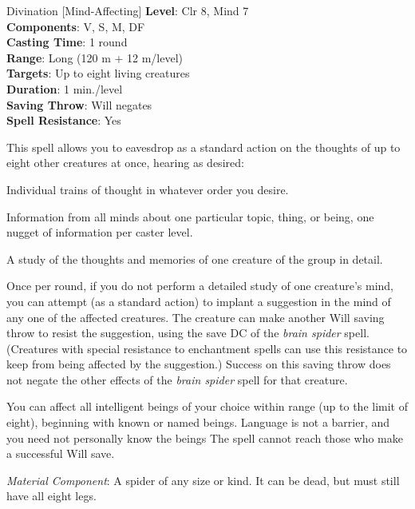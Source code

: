 {Divination [Mind-Affecting]}
{
	\textbf{Level}: Clr 8, Mind 7\\
	\textbf{Components}: V, S, M, DF\\
	\textbf{Casting Time}: 1 round\\
	\textbf{Range}: Long (120 m + 12 m/level)\\
	\textbf{Targets}: Up to eight living creatures\\
	\textbf{Duration}: 1 min./level\\
	\textbf{Saving Throw}: Will negates\\
	\textbf{Spell Resistance}: Yes\\
}
{
	This spell allows you to eavesdrop as a standard action on the thoughts of up to eight other creatures at once, hearing as desired:
	\begin{itemize*}
		\item Individual trains of thought in whatever order you desire.
		\item Information from all minds about one particular topic, thing, or being, one nugget of information per caster level.
		\item A study of the thoughts and memories of one creature of the group in detail.
	\end{itemize*}

	Once per round, if you do not perform a detailed study of one creature's mind, you can attempt (as a standard action) to implant a suggestion in the mind of any one of the affected creatures. The creature can make another Will saving throw to resist the suggestion, using the save DC of the \emph{brain spider} spell. (Creatures with special resistance to enchantment spells can use this resistance to keep from being affected by the suggestion.) Success on this saving throw does not negate the other effects of the \emph{brain spider} spell for that creature.

	You can affect all intelligent beings of your choice within range (up to the limit of eight), beginning with known or named beings. Language is not a barrier, and you need not personally know the beings The spell cannot reach those who make a successful Will save.

	\textit{Material Component}: A spider of any size or kind. It can be dead, but must still have all eight legs.
}